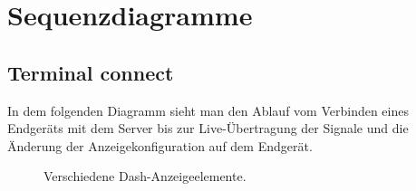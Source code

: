 \documentclass[entwurf.tex]{subfiles}
\begin{document}
\chapter{Sequenzdiagramme}
	\section{Terminal connect}
		In dem folgenden Diagramm sieht man den Ablauf vom Verbinden eines Endgeräts mit dem Server bis zur Live-Übertragung der Signale und die Änderung der Anzeigekonfiguration auf dem Endgerät. 
		\begin{figure}[H]
  			\caption{Verschiedene Dash-Anzeigeelemente.}
  		\end{figure}
\end{document}
